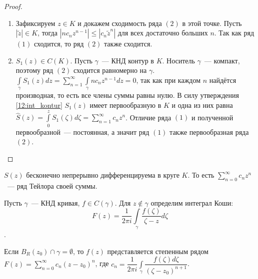 \begin{proof}
    \begin{enumerate}[wide=5pt, label=\arabic*., itemsep=0ex]
        \item Зафиксируем \(z \in K\) и докажем сходимость ряда \((2)\) в этой точке. Пусть
        \(|\tilde{z}| \in K\), тогда \(|n c_n z^{n-1}| \le |c_n \tilde{z}^n|\) для всех достаточно
        больших \(n\). Так как ряд \((1)\) сходится, то ряд \((2)\) также сходится.
        \item \(S_1(z) \in C(K)\). Пусть \(\gamma\)~--- КНД контур в \(K\). Носитель \(\gamma\)~---
        компакт, поэтому ряд \((2)\) сходится равномерно на \(\gamma\). \(\int\limits_\gamma S_1(z)
        dz = \sum\limits_{n = 1}^\infty \int\limits_\gamma n c_n z^{n-1} dz = 0\), так как при
        каждом \(n\) найдётся производная, то есть все члены суммы равны нулю. В силу утверждения
        \ref{12:int_kontur} \(S_1(z)\) имеет первообразную в \(K\) и одна из них равна \(\hat{S}(z)
        = \int\limits_0^z{S_1(\zeta) d\zeta} = \sum\limits_{n=1}^\infty c_n z^n\). Отличие ряда
        \((1)\) и полученной первообразной~--- постоянная, а значит ряд \((1)\) также первообразная
        ряда \((2)\).
    \end{enumerate}
\end{proof}

\begin{corollary}
    \(S(z)\) бесконечно непрерывно дифференцируема в круге \(K\). То есть \(\sum\limits_{n=0}^\infty
    {c_n z^n}\)~--- ряд Тейлора своей суммы.
\end{corollary}



Пусть \(\gamma\)~--- КНД кривая, \(f \in C(\gamma)\). Для \(z \notin \gamma\) определим интеграл
Коши: \[F(z) = \dfrac{1}{2 \pi i} \int\limits_\gamma \dfrac{f(\zeta)}{\zeta - z} d\zeta \tag{1}\].

\begin{statement}\label{14:int_koshi}
    Если \(B_R (z_0) \cap \gamma = \emptyset\), то \(f(z)\) представляется степенным рядом \(F(z) =
    \sum\limits_{n=0}^\infty{c_n(z-z_0)^n}\), где \(c_n = \dfrac{1}{2 \pi i} \int\limits_\gamma
    \dfrac{f(\zeta) d\zeta}{(\zeta - z_0)^{n+1}}\).
\end{statement}
